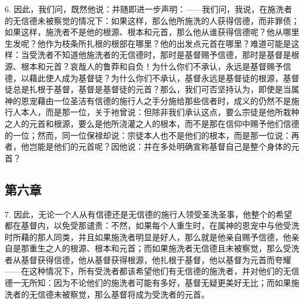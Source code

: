 6. 因此，我们问，既然他说：并随即进一步声明：——我们问，我说，在施洗者的无信德未被察觉的情况下：如果这样，那么他所施洗的人获得信德，而非罪债；如果这样，施洗者不是他的根源、根本和元首，那么他从谁获得信德呢？他从哪里生发呢？他作为枝条所扎根的根部在哪里？他的出发点元首在哪里？难道可能是这样：当受洗者不知道他施洗者的无信德时，那时是基督赐予信德，那时是基督是根源、根本和元首？哀哉人的鲁莽和自负！为什么你们不承认，永远是基督赐予信德，以藉此使人成为基督徒？为什么你们不承认，基督永远是基督徒的根源，基督徒总是扎根于基督，基督是基督徒的元首？那么，我们可否坚持认为，即使是当属神的恩宠藉由一位圣洁有信德的施行人之手分施给那些信者时，成义的仍然不是施行人本人，而是那一位，关于衪曾说：但除非我们承认这点，要么宗徒是他所栽种之人的元首和根源，要么是他所浇灌之人的根本，而不是那在信仰中赐予他们信德的一位；然而，同一位保禄却说：宗徒本人也不是他们的根本，而是那一位说：再者，他岂能是他们的元首呢？因他说：并在多处明确宣称基督自己是整个身体的元首？\par


\subsection{第六章}

7. 因此，无论一个人从有信德还是无信德的施行人领受圣洗圣事，他整个的希望都在基督内，以免受那谴责：不然，如果每个人重生时，在属神的恩宠中与他受洗时所藉的那人同类，并且如果施洗者明显是好人，那么就是他亲自赐予信德，他亲自是那重生之人的根源、根本和元首；而如果施洗者无信德且未被察觉，那么受洗者从基督获得信德，他从基督获得根源，他扎根于基督，他以基督为元首而夸耀——在这种情况下，所有受洗者都该希望他们有无信德的施洗者，并对他们的无信德一无所知：因为不论他们的施洗者可能有多好，基督无疑更美好无比；而如果施洗者的无信德未被察觉，那么基督将成为受洗者的元首。\par


